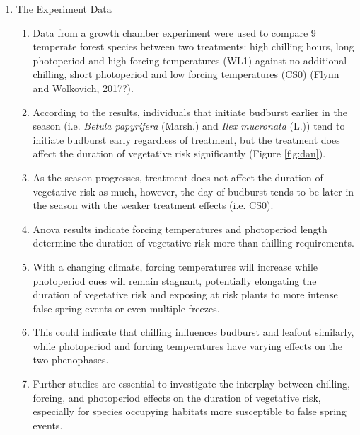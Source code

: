 \documentclass{article}\usepackage[]{graphicx}\usepackage[]{color}
\begin{document}
\begin{enumerate}
\begin{enumerate}
\item The Experiment Data
\begin{enumerate}
\item Data from a growth chamber experiment were used to compare 9 temperate forest species between two treatments: high chilling hours, long photoperiod and high forcing temperatures (WL1) against no additional chilling, short photoperiod and low forcing temperatures (CS0) (Flynn and Wolkovich, 2017?).
\item According to the results, individuals that initiate budburst earlier in the season (i.e. {\textit {Betula papyrifera}} (Marsh.) and {\textit{Ilex mucronata}} (L.)) tend to initiate budburst early regardless of treatment, but the treatment does affect the duration of vegetative risk significantly (Figure \ref{fig:dan}).
\item As the season progresses, treatment does not affect the duration of vegetative risk as much, however, the day of budburst tends to be later in the season with the weaker treatment effects (i.e. CS0).
\item Anova results indicate forcing temperatures and photoperiod length determine the duration of vegetative risk more than chilling requirements.
\item With a changing climate, forcing temperatures will increase while photoperiod cues will remain stagnant, potentially elongating the duration of vegetative risk and exposing at risk plants to more intense false spring events or even multiple freezes. %
\item This could indicate that chilling influences budburst and leafout similarly, while photoperiod and forcing temperatures have varying effects on the two phenophases.
\item Further studies are essential to investigate the interplay between chilling, forcing, and photoperiod effects on the duration of vegetative risk, especially for species occupying habitats more susceptible to false spring events. 
\end{enumerate}
\end {enumerate}
\end{enumerate}

\end{document}
